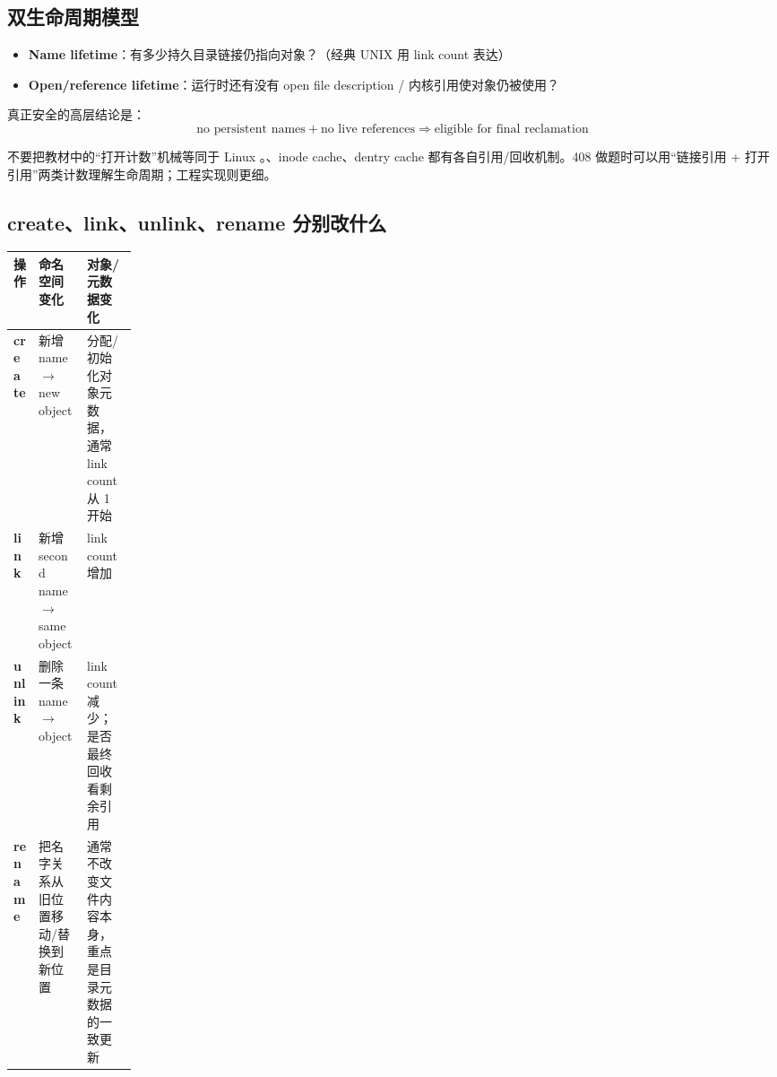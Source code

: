 \documentclass[11pt,a4paper]{ctexart}
\newcommand{\kw}[1]{\textbf{#1}}
\newcommand{\code}[1]{\texttt{\detokenize{#1}}}
\begin{document}
\begin{center}
\end{center}

\subsection{双生命周期模型}
\begin{itemize}
  \item \kw{Name lifetime}：有多少持久目录链接仍指向对象？（经典 UNIX 用 link count 表达）
  \item \kw{Open/reference lifetime}：运行时还有没有 open file description / 内核引用使对象仍被使用？
\end{itemize}
真正安全的高层结论是：
\[
\boxed{\text{no persistent names} + \text{no live references} \Rightarrow \text{eligible for final reclamation}}
\]

\begin{eng}
不要把教材中的“打开计数”机械等同于 Linux \code{inode.i_count}。\code{struct file}、inode cache、dentry cache 都有各自引用/回收机制。408 做题时可以用“链接引用 + 打开引用”两类计数理解生命周期；工程实现则更细。
\end{eng}

\subsection{create、link、unlink、rename 分别改什么}
\begin{center}
\small
\begin{tabularx}{\linewidth}{>{\bfseries}p{0.16\linewidth} X X}
\toprule
操作 & 命名空间变化 & 对象/元数据变化 \\
\midrule
create & 新增 name $\to$ new object & 分配/初始化对象元数据，通常 link count 从 1 开始 \\
link & 新增 second name $\to$ same object & link count 增加 \\
unlink & 删除一条 name $\to$ object & link count 减少；是否最终回收看剩余引用 \\
rename & 把名字关系从旧位置移动/替换到新位置 & 通常不改变文件内容本身，重点是目录元数据的一致更新 \\
\bottomrule
\end{tabularx}
\end{center}
\end{document}
